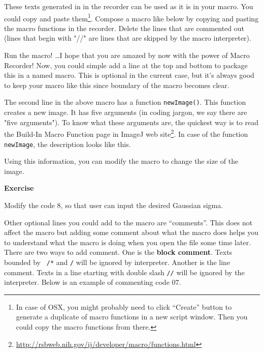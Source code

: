 \documentclass[11pt,a4paper,oneside]{report}
\newenvironment{indentexercise}[1]%
{{\setlength{\leftmargin}{2em}}%
\textbf{Exercise \thesubsection-#1}%
\begin{list}{}%
	\item%
}
{\end{list}}
\newenvironment{indentCom}%
{\begin{list}{}%
         {\setlength{\leftmargin}{1em}}%
         \item[]%
}
{\end{list}}
\newcommand{\ilcom}[1]{\texttt{\small#1}}
\begin{document}
These texts generated in in the recorder can be used as it is in your macro.  You could copy and paste them\footnote{In case of OSX, you might probably need to click ``Create'' button to generate a duplicate of macro functions in a new script window. Then you could copy the macro functions from there.}. Compose a macro like below by copying and pasting the macro functions in the recorder.  Delete the lines that are commented out (lines that begin with "//" are lines that are skipped by the macro interpreter).


Run the macro! \ldots I hope that you are amazed by now with the power of Macro
Recorder! Now, you could simple add a line at the top and bottom to package this in a named macro. This is optional in the current case, but it's always good to keep your macro like this since boundary of the macro becomes clear. 
 


The second line in the above macro has a function \ilcom{newImage()}. This
function creates a new image. It has five arguments (in coding jargon, we say
there are "five arguments"). To know what these arguments are, 
the quickest way is to read the Build-In Macro Function page in ImageJ web site\footnote{\url{http://rsbweb.nih.gov/ij/developer/macro/functions.html}}.  
In case of the function \ilcom{newImage}, the description looks like this. 

\begin{indentCom}

\end{indentCom}
Using this information, you can modify the macro to change the size of the image.

\begin{indentexercise}{1}
Modify the code 8, so that user can input the desired Gaussian sigma.
\end{indentexercise}

Other optional lines you could add to the macro are ``comments''. This does not affect the macro but adding some comment about what the macro does helps you to understand what the macro is doing when you open the file some time later. There are two ways to add comment. One is the \textbf{block comment}. Texts bounded by \ilcom{ /*} and \ilcom{*/} will be ignored by interpreter. Another is the line comment. Texts in a line starting with double slash \ilcom{//} will be ignored by the interpreter. Below is an example of commenting code 07. 
\end{document}
